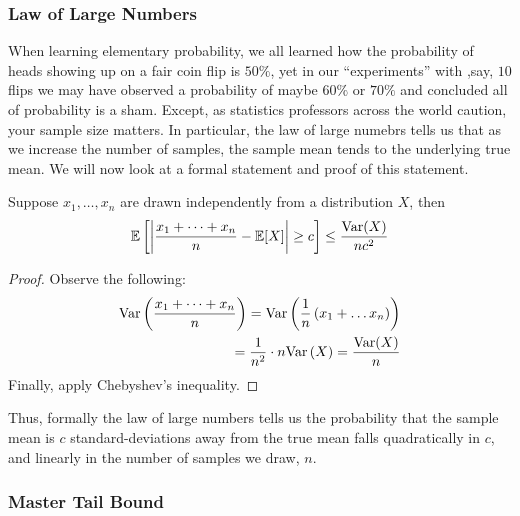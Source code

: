 \subsubsection{Law of Large Numbers}
\label{sec:prob:conc:lol}
When learning elementary probability, we all learned how the probability of heads showing up
on a fair coin flip is $50\%$, yet in our ``experiments'' with ,say, $10$ flips we may have
observed a probability of maybe $60\%$ or $70\%$ and concluded all of probability is a sham.
Except, as statistics professors across the world caution, your sample size matters.
In particular, the law of large numebrs tells us that as we increase the number of samples,
the sample mean tends to the underlying true mean. We will now look at a formal statement and
proof of this statement.
\begin{theorem}
   Suppose $x_1, \dots, x_n$ are drawn independently from a distribution $X$, then
   \begin{align*}
    \mathbb{E}\left[ \left| \frac{x_1 + \dots + x_n}{n} - \mathbb{E}[X]\right| \geq c \right] \leq \frac{\mathrm{Var}(X)}{nc^2}
   \end{align*}
\end{theorem}
\begin{proof}
    Observe the following:
    \begin{align*}
        \mathrm{Var} \left( \frac{x_1 + \dots + x_n}{n} \right) = \mathrm{Var} \left( \frac{1}{n} \left( x_1 + \dots x_n\right) \right) \\
        = \frac{1}{n^2} \cdot  n\mathrm{Var}\left( X \right) = \frac{\mathrm{Var}(X)}{n}
    \end{align*}
    Finally, apply Chebyshev's inequality.
\end{proof}
Thus, formally the law of large numbers tells us the probability that the sample mean is $c$ standard-deviations away
from the true mean falls quadratically in $c$, and linearly in the number of samples we draw, $n$.
\subsubsection{Master Tail Bound}
\label{sec:prob:conc:master}

